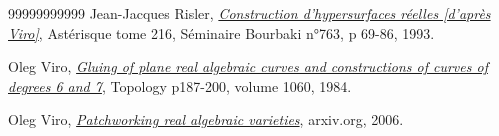\documentclass{article}
\begin{document}
\begin{thebibliography}{99999999999}
 Jean-Jacques Risler, \emph{\href{https://www.numdam.org/article/SB_1992-1993__35__69_0.pdf}{Construction d'hypersurfaces réelles [d'après Viro]}}, Astérisque tome 216, Séminaire Bourbaki n°763, p 69-86, 1993.

 Oleg Viro, \emph{\href{https://link.springer.com/chapter/10.1007/BFb0099934}{Gluing of plane real algebraic curves and constructions of curves of} \href{https://link.springer.com/chapter/10.1007/BFb0099934}{degrees 6 and 7}}, Topology p187-200, volume 1060, 1984.

 Oleg Viro, \emph{\href{https://arxiv.org/abs/math/0611382}{Patchworking real algebraic varieties}}, arxiv.org, 2006.

\end{thebibliography}


 
\end{document}
